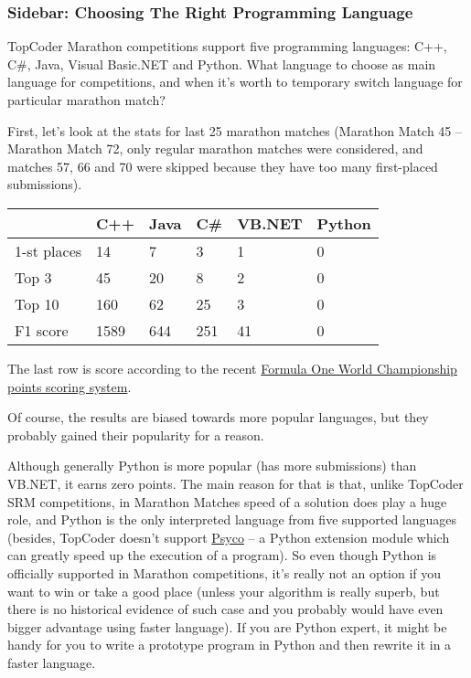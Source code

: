 \documentclass[]{article}
\begin{document}
\hypertarget{sidebar-choosing-the-right-programming-language}{%
\subsubsection{Sidebar: Choosing The Right Programming
Language}\label{sidebar-choosing-the-right-programming-language}}

TopCoder Marathon competitions support five programming languages: C++,
C\#, Java, Visual Basic.NET and Python. What language to choose as main
language for competitions, and when it's worth to temporary switch
language for particular marathon match?

First, let's look at the stats for last 25 marathon matches (Marathon
Match 45 -- Marathon Match 72, only regular marathon matches were
considered, and matches 57, 66 and 70 were skipped because they have too
many first-placed submissions).

\begin{longtable}[]{@{}llllll@{}}
\toprule
& C++ & Java & C\# & VB.NET & Python\tabularnewline
\midrule
\endhead
1-st places & 14 & 7 & 3 & 1 & 0\tabularnewline
Top 3 & 45 & 20 & 8 & 2 & 0\tabularnewline
Top 10 & 160 & 62 & 25 & 3 & 0\tabularnewline
F1 score & 1589 & 644 & 251 & 41 & 0\tabularnewline
\bottomrule
\end{longtable}

The last row is score according to the recent
\href{https://en.wikipedia.org/wiki/List_of_Formula_One_World_Championship_points_scoring_systems}{Formula
One World Championship points scoring system}.

Of course, the results are biased towards more popular languages, but
they probably gained their popularity for a reason.

Although generally Python is more popular (has more submissions) than
VB.NET, it earns zero points. The main reason for that is that, unlike
TopCoder SRM competitions, in Marathon Matches speed of a solution does
play a huge role, and Python is the only interpreted language from five
supported languages (besides, TopCoder doesn't support
\href{http://psyco.sourceforge.net}{Psyco} -- a Python extension module
which can greatly speed up the execution of a program). So even though
Python is officially supported in Marathon competitions, it's really not
an option if you want to win or take a good place (unless your algorithm
is really superb, but there is no historical evidence of such case and
you probably would have even bigger advantage using faster language). If
you are Python expert, it might be handy for you to write a prototype
program in Python and then rewrite it in a faster language.
\end{document}

